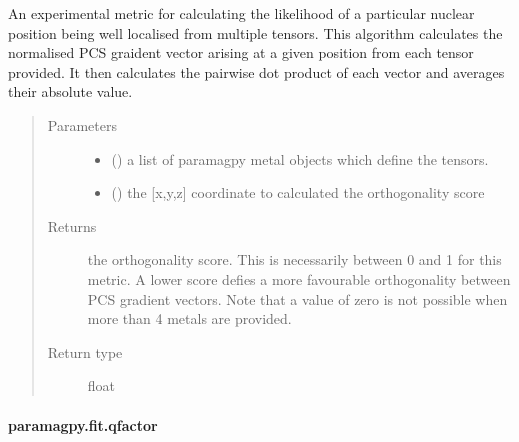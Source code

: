 \documentclass[a4paper,10pt,english,openany,oneside]{sphinxmanual}
\begin{document}
\begin{fulllineitems}
\label{\detokenize{reference/generated/paramagpy.fit.pcs_gradient_orthogonality_dot:paramagpy.fit.pcs_gradient_orthogonality_dot}}
An experimental metric for calculating the likelihood
of a particular nuclear position being well localised
from multiple tensors.
This algorithm calculates the normalised PCS graident
vector arising at a given position from each tensor
provided. It then calculates the pairwise dot product
of each vector and averages their absolute value.
\begin{quote}\begin{description}
\item[{Parameters}] \leavevmode\begin{itemize}
\item {} 
 () \textendash{} a list of paramagpy metal objects which define the
tensors.

\item {} 
 () \textendash{} the {[}x,y,z{]} coordinate to calculated the
orthogonality score

\end{itemize}

\item[{Returns}] \leavevmode
{} \textendash{} the orthogonality score. This is necessarily
between 0 and 1 for this metric. A lower
score defies a more favourable orthogonality
between PCS gradient vectors.
Note that a value of zero is not possible when
more than 4 metals are provided.

\item[{Return type}] \leavevmode
float

\end{description}\end{quote}

\end{fulllineitems}



\paragraph{paramagpy.fit.qfactor}
\label{\detokenize{reference/generated/paramagpy.fit.qfactor:paramagpy-fit-qfactor}}\label{\detokenize{reference/generated/paramagpy.fit.qfactor::doc}}
\end{document}
